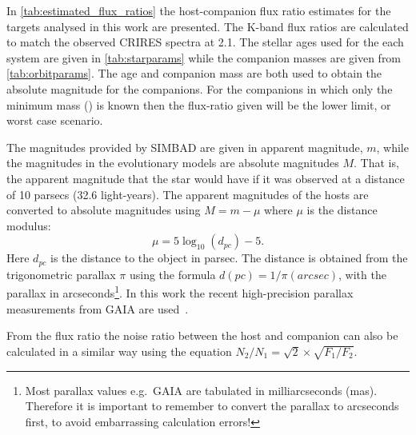 In \cref{tab:estimated_flux_ratios} the host-companion flux ratio estimates for the targets analysed in this work are presented. The {K}-band flux ratios are calculated to match the observed {CRIRES} spectra at 2.1\um{}. The stellar ages used for the each system are given in \cref{tab:starparams} while the companion masses are given from \cref{tab:orbitparams}. The age and companion mass are both used to obtain the absolute magnitude for the companions. For the companions in which only the minimum mass (\mtwosini{}) is known then the flux-ratio given will be the lower limit, or worst case scenario.


The magnitudes provided by {SIMBAD} are given in apparent magnitude, $m$, while the magnitudes in the evolutionary models are absolute magnitudes $M$. That is, the apparent magnitude that the star would have if it was observed at a distance of 10 parsecs (32.6 light-years). The apparent magnitudes of the hosts are converted to absolute magnitudes using \(M = m - \mu\) where \(\mu\) is the distance modulus:
\begin{equation}
\mu = 5 \log_{10}(d_{pc}) -5. \label{eqn:distance_modulus}
\end{equation}
Here $d_{pc}$ is the distance to the object in parsec. The distance is obtained from the trigonometric parallax  $\pi$ using the formula $d(pc) = 1 /\pi(arcsec)$, with the parallax in arcseconds\footnote{Most parallax values e.g.\ GAIA are tabulated in milliarcseconds (mas). Therefore it is important to remember to convert the parallax to arcseconds first, to avoid embarrassing calculation errors!}. In this work the recent high-precision parallax measurements from GAIA are used~\citet{collaboration_gaia_2018}.

From the flux ratio the noise ratio between the host and companion can also be calculated in a similar way using the equation \(N_{2}/N_{1} = \sqrt{2} \times\sqrt{F_{1}/F_{2}}\).



